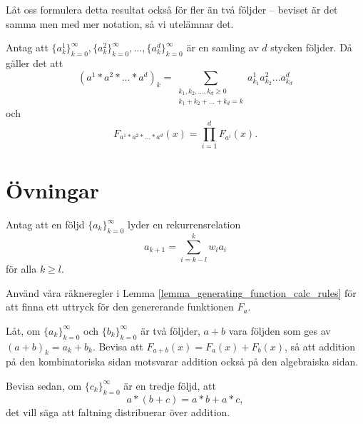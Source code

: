 \documentclass[nobib]{tufte-handout}
\begin{document}
Låt oss formulera detta resultat också för fler än två följder -- beviset är det samma men med mer notation, så vi utelämnar det.

\begin{lemma}
    Antag att $\{a^1_k\}_{k=0}^\infty, \{a^2_k\}_{k=0}^\infty, \ldots, \{a^d_k\}_{k=0}^\infty$ är en samling av $d$ stycken följder. Då gäller det att
    $$(a^1*a^2*\ldots*a^d)_k = \sum_{\substack{k_1, k_2, \ldots, k_d \geq 0\\k_1 + k_2 + \ldots + k_d = k}} a^1_{k_1}a^2_{k_2}\ldots a^d_{k_d}$$
    och
    $$F_{a^1 * a^2 * \ldots * a^d}(x) = \prod_{i=1}^{d} F_{a^i}(x).$$
\end{lemma}


\section{Övningar}

\begin{xca}
    Antag att en följd $\{a_k\}_{k=0}^\infty$ lyder en rekurrensrelation
    $$a_{k+1} = \sum_{i = k - l}^{k} w_i a_i$$
    för alla $k \geq l$.

    Använd våra räkneregler i Lemma \ref{lemma_generating_function_calc_rules} för att finna ett uttryck för den genererande funktionen $F_a$.
\end{xca}

\begin{xca}
    Låt, om $\{a_k\}_{k=0}^\infty$ och $\{b_k\}_{k=0}^\infty$ är två följder, $a+b$ vara följden som ges av $(a+b)_k = a_k + b_k$. Bevisa att $F_{a+b}(x) = F_a(x) + F_b(x)$, så att addition på den kombinatoriska sidan motsvarar addition också på den algebraiska sidan.
    
    Bevisa sedan, om $\{c_k\}_{k=0}^\infty$ är en tredje följd, att
    $$a*(b + c) = a*b + a*c,$$
    det vill säga att faltning distribuerar över addition.
\end{xca}

%
%
\end{document}
